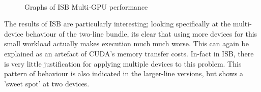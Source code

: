 \begin{figure}[h!]
  \centering
  \\
  \caption{Graphs of ISB Multi-GPU performance}
  \label{fig:GPU-ISB-multicomp}
\end{figure}

The results of ISB are particularly interesting; looking specifically at the multi-device behaviour of the two-line bundle, its clear that using more devices for this small workload actually makes execution much much worse. This can again be explained as an artefact of CUDA's memory transfer costs. In-fact in ISB, there is very little justification for applying multiple devices to this problem. This pattern of behaviour is also indicated in the larger-line versions, but shows a 'sweet spot' at two devices.

